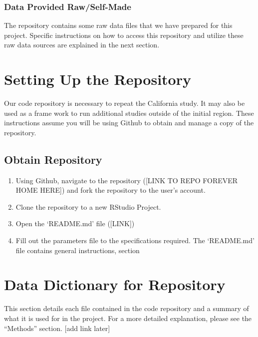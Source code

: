 \documentclass[
]{book}
\providecommand{\tightlist}{%
  \setlength{\itemsep}{0pt}\setlength{\parskip}{0pt}}
\begin{document}
\hypertarget{data-provided-rawself-made}{%
\subsection{Data Provided Raw/Self-Made}\label{data-provided-rawself-made}}

The repository contains some raw data files that we have prepared for this project. Specific instructions on how to access this repository and utilize these raw data sources are explained in the next section.

\hypertarget{setting-up-the-repository}{%
\chapter{Setting Up the Repository}\label{setting-up-the-repository}}

Our code repository is necessary to repeat the California study. It may also be used as a frame work to run additional studies outside of the initial region. These instructions assume you will be using Github to obtain and manage a copy of the repository.

\hypertarget{obtain-repository}{%
\section{Obtain Repository}\label{obtain-repository}}

\begin{enumerate}
\def\labelenumi{\arabic{enumi}.}
\tightlist
\item
  Using Github, navigate to the repository ({[}LINK TO REPO FOREVER HOME HERE{]}) and fork the repository to the user's account.
\item
  Clone the repository to a new RStudio Project.
\item
  Open the `README.md' file ({[}LINK{]})\\
\item
  Fill out the parameters file to the specifications required. The `README.md' file contains general instructions, section
\end{enumerate}

\hypertarget{data-dictionary-for-repository}{%
\chapter{Data Dictionary for Repository}\label{data-dictionary-for-repository}}

This section details each file contained in the code repository and a summary of what it is used for in the project. For a more detailed explanation, please see the ``Methods'' section. {[}add link later{]}
\end{document}
